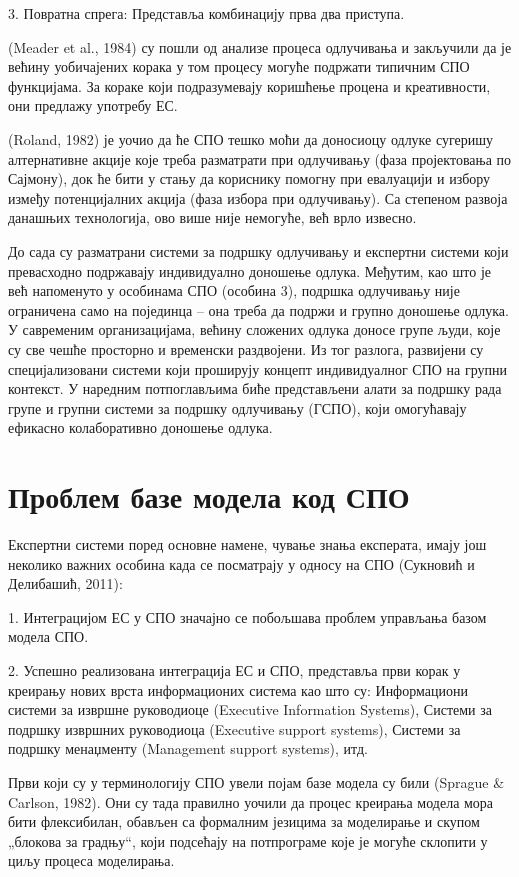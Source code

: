 3. Повратна спрега: Представља комбинацију прва два приступа.

(Meader et al., 1984) су пошли од анализе процеса одлучивања и закључили да је већину уобичајених корака у том процесу могуће подржати типичним СПО функцијама. За кораке који подразумевају коришћење процена и креативности, они предлажу употребу ЕС.

(Roland, 1982) је уочио да ће СПО тешко моћи да доносиоцу одлуке сугеришу алтернативне акције које треба разматрати при одлучивању (фаза пројектовања по Сајмону), док ће бити у стању да кориснику помогну при евалуацији и избору између потенцијалних акција (фаза избора при одлучивању). Са степеном развоја данашњих технологија, ово више није немогуће, већ врло извесно.

До сада су разматрани системи за подршку одлучивању и експертни системи који превасходно подржавају индивидуално доношење одлука. Међутим, као што је већ напоменуто у особинама СПО (особина 3), подршка одлучивању није ограничена само на појединца – она треба да подржи и групно доношење одлука. У савременим организацијама, већину сложених одлука доносе групе људи, које су све чешће просторно и временски раздвојени. Из тог разлога, развијени су специјализовани системи који проширују концепт индивидуалног СПО на групни контекст. У наредним потпоглављима биће представљени алати за подршку рада групе и групни системи за подршку одлучивању (ГСПО), који омогућавају ефикасно колаборативно доношење одлука.

\section{Проблем базе модела код СПО}
Експертни системи поред основне намене, чување знања експерата, имају још неколико важних особина када се посматрају у односу на СПО (Сукновић и Делибашић, 2011):

1. Интеграцијом ЕС у СПО значајно се побољшава проблем управљања базом модела СПО.

2. Успешно реализована интеграција ЕС и СПО, представља први корак у креирању нових врста информационих система као што су: Информациони системи за извршне руководиоце (Executive Information Systems), Системи за подршку извршних руководиоца (Executive support systems), Системи за подршку менаџменту (Management support systems), итд.

Први који су у терминологију СПО увели појам базе модела су били (Sprague \& Carlson, 1982). Они су тада правилно уочили да процес креирања модела мора бити флексибилан, обављен са формалним језицима за моделирање и скупом „блокова за градњу“, који подсећају на потпрограме које је могуће склопити у циљу процеса моделирања.

